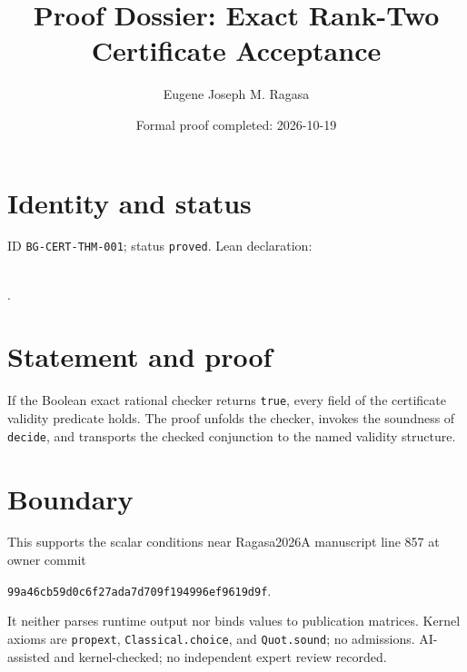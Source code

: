 \documentclass[11pt]{article}
\title{Proof Dossier: Exact Rank-Two Certificate Acceptance}\author{Eugene Joseph M. Ragasa}\date{Formal proof completed: 2026-10-19}
\begin{document}
\maketitle
\section{Identity and status}
ID \texttt{BG-CERT-THM-001}; status \texttt{proved}. Lean declaration:
\par{}\\
{\tiny{}}.
\section{Statement and proof}
If the Boolean exact rational checker returns \texttt{true}, every field of the
certificate validity predicate holds. The proof unfolds the checker, invokes the
soundness of \texttt{decide}, and transports the checked conjunction to the named
validity structure.
\section{Boundary}
This supports the scalar conditions near Ragasa2026A manuscript line 857 at owner commit
\begin{center}\small\texttt{99a46cb59d0c6f27ada7d709f194996ef9619d9f}.\end{center}
It neither parses runtime output nor binds values to publication matrices. Kernel axioms
are \texttt{propext}, \texttt{Classical.choice}, and \texttt{Quot.sound}; no admissions.
AI-assisted and kernel-checked; no independent expert review recorded.
\end{document}
